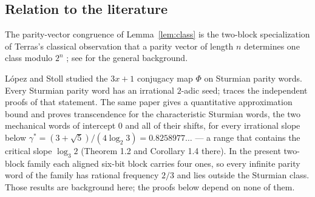 \documentclass[11pt,a4paper]{article}
\theoremstyle{plain}
\theoremstyle{definition}
\theoremstyle{remark}
\begin{document}
\subsection{Relation to the literature}

The parity-vector congruence of Lemma~\ref{lem:class} is the two-block
specialization of Terras's classical observation that a parity vector of length
$n$ determines one class modulo $2^n$ \cite{Terras1976}; see
\cite{Lagarias1985} for the general background.

L\'opez and Stoll \cite{LopezStoll2009} studied the $3x+1$ conjugacy map $\Phi$
on Sturmian parity words. Every Sturmian parity word has an irrational $2$-adic
seed; \cite[\S1.2]{DeJesusSturmian2026} traces the independent proofs of that
statement. The same paper gives a quantitative approximation bound and proves
transcendence for the characteristic Sturmian words, the two mechanical words
of intercept $0$ and all of their shifts, for every irrational slope below
$\gamma^{\ast}=(3+\sqrt5)/(4\log_2 3)=0.8258977\ldots$ --- a range that
contains the critical slope $\log_3 2$ (Theorem 1.2 and Corollary 1.4 there).
In the present two-block family each aligned six-bit block carries four ones,
so every infinite parity word of the family has rational frequency $2/3$ and
lies outside the Sturmian class. Those results are background here; the proofs
below depend on none of them.
\end{document}
